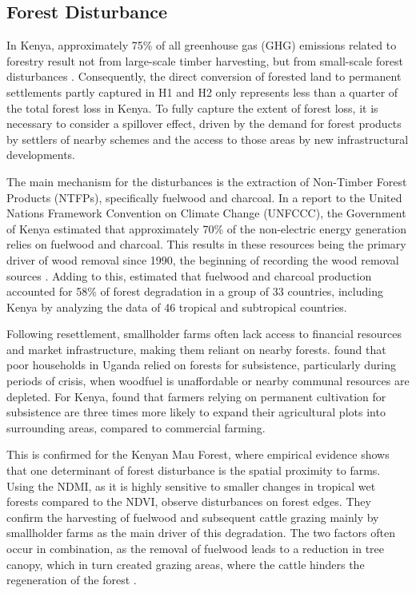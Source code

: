 \subsection{Forest Disturbance}

In Kenya, approximately 75\% of all greenhouse gas (GHG) emissions related to forestry result not from large-scale timber harvesting, but from small-scale forest disturbances \parencite{pearsonGreenhouseGasEmissions2017}.
Consequently, the direct conversion of forested land to permanent settlements partly captured in H1 and H2 only represents less than a quarter of the total forest loss in Kenya.
To fully capture the extent of forest loss, it is necessary to consider a spillover effect, driven by the demand for forest products by settlers of nearby schemes and the access to those areas by new infrastructural developments.

The main mechanism for the disturbances is the extraction of Non-Timber Forest Products (NTFPs), specifically fuelwood and charcoal.
In a report to the United Nations Framework Convention on Climate Change (UNFCCC), the Government of Kenya estimated that approximately 70\% of the non-electric energy generation relies on fuelwood and charcoal.
This results in these resources being the primary driver of wood removal since 1990, the beginning of recording the wood removal sources \parencite{governmentofkenyaSecondNationalCommunication2015}.
Adding to this, \cite{hosonumaAssessmentDeforestationForest2012} estimated that fuelwood and charcoal production accounted for 58\% of forest degradation in a group of 33 countries, including Kenya by analyzing the data of 46 tropical and subtropical countries.

Following resettlement, smallholder farms often lack access to financial resources and market infrastructure, making them reliant on nearby forests.
\cite{naughton-trevesLessonsParksPoverty2011} found that poor households in Uganda relied on forests for subsistence, particularly during periods of crisis, when woodfuel is unaffordable or nearby communal resources are depleted.
For Kenya, \cite{geistProximateCausesUnderlying2002} found that farmers relying on permanent cultivation for subsistence are three times more likely to expand their agricultural plots into surrounding areas, compared to commercial farming.

This is confirmed for the Kenyan Mau Forest, where empirical evidence shows that one determinant of forest disturbance is the spatial proximity to farms.
Using the NDMI, as it is highly sensitive to smaller changes in tropical wet forests compared to the NDVI, \cite{brandtSustainableIntensificationDairy2018} observe disturbances on forest edges.
They confirm the harvesting of fuelwood and subsequent cattle grazing mainly by smallholder farms as the main driver of this degradation.
The two factors often occur in combination, as the removal of fuelwood leads to a reduction in tree canopy, which in turn created grazing areas, where the cattle hinders the regeneration of the forest \parencite{brandtSustainableIntensificationDairy2018}.

